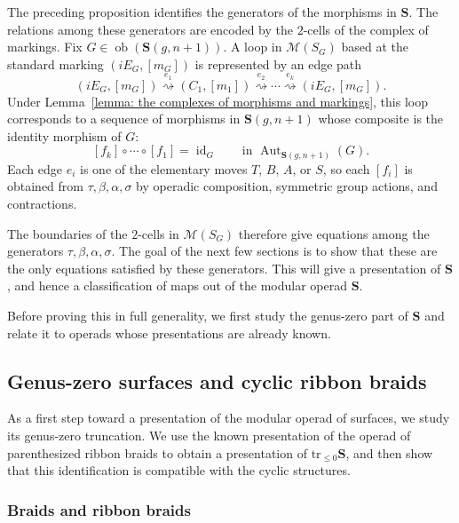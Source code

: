\documentclass{amsart}
\newcommand{\bS}{\mathbf{S}}
\newcommand{\calM}{\mathcal{M}}
\newcommand{\id}{\operatorname{id}}
\newcommand{\ob}{\operatorname{ob}}
\newcommand{\Aut}{\operatorname{Aut}}
\newcommand{\trun}[1]{\mathrm{tr}_{\leq{#1}}}
\theoremstyle{definition}
\numberwithin{equation}{section}
\begin{document}
The preceding proposition identifies the generators of the morphisms in $\bS$. The relations among these generators are encoded by the $2$-cells of the complex of markings.  Fix $G\in \ob(\bS(g,n+1))$. A loop in $\calM(S_G)$ based at the standard marking $(iE_G,[m_G])$ is represented by an edge path
\[
(iE_G,[m_G])
\overset{e_1}{\rightsquigarrow}
(C_1,[m_1])
\overset{e_2}{\rightsquigarrow}
\cdots
\overset{e_k}{\rightsquigarrow}
(iE_G,[m_G]).
\]
Under Lemma~\ref{lemma: the complexes of morphisms and markings}, this loop corresponds to a sequence of morphisms in $\bS(g,n+1)$ whose composite is the identity morphism of $G$:
\[
[f_k]\circ \cdots \circ [f_1]=\id_G
\qquad\text{in }\Aut_{\bS(g,n+1)}(G).
\]
Each edge $e_i$ is one of the elementary moves $T$, $B$, $A$, or $S$, so each $[f_i]$ is obtained from $\tau,\beta,\alpha,\sigma$ by operadic composition, symmetric group actions, and contractions.

The boundaries of the $2$-cells in $\calM(S_G)$ therefore give equations among
the generators $\tau,\beta,\alpha,\sigma$. The goal of the next few sections is
to show that these are the only equations satisfied by these generators. This
will give a presentation of $\bS$, and hence a classification of maps out of the
modular operad $\bS$.

Before proving this in full generality, we first study the genus-zero part of $\bS$ and relate it to operads whose presentations are already known.

\subsection{Genus-zero surfaces and cyclic ribbon braids} \label{sec: operad of ribbon braids}
As a first step toward a presentation of the modular operad of surfaces, we study its genus-zero truncation. We use the known presentation of the operad of parenthesized ribbon braids to obtain a presentation of $\trun{0}\bS$, and then show that this identification is compatible with the cyclic structures. %

\subsubsection{Braids and ribbon braids}
\end{document}
